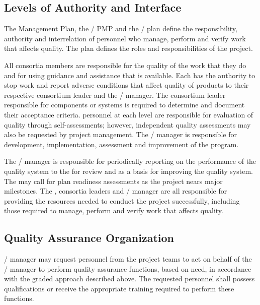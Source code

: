 \subsection{Levels of Authority and Interface}

The  Management Plan, the / PMP
and the /  plan define the
responsibility, authority and interrelation of personnel who manage,
perform and verify work that affects quality. The  plan
defines the  roles and responsibilities of the 
project.

All consortia members are responsible for the quality of the work that
they do and for using guidance and assistance that is available. Each
has the authority to stop work and report adverse conditions that
affect quality of  products to their respective
 consortium leader and the /
 manager. The consortium leader responsible for 
components or systems is required to determine and document their
acceptance criteria.  personnel at each level are
responsible for evaluation of quality through self-assessments;
however, independent quality assessments may also be requested by
project management.  The /  manager is
responsible for development, implementation, assessment and
improvement of the  program.

The /  manager is responsible for
periodically reporting on the performance of the quality system to the
  for review and as a basis for improving
the quality system. The   may call for
 plan readiness assessments as the project nears major
milestones. The  , consortia leaders and
/  manager are all responsible for
providing the resources needed to conduct the project successfully,
including those required to manage, perform and verify work that
affects quality.

\subsection{Quality Assurance Organization}

/  manager may request personnel
from the  project teams to act on behalf of the
/  manager to perform quality
assurance functions, based on need, in accordance with the graded
approach described above. The requested personnel shall possess
qualifications or receive the appropriate training required to perform
these functions.

